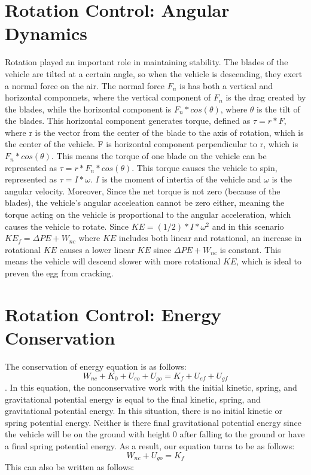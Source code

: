 \documentclass[12pt]{report}
\begin{document}
\section{Rotation Control: Angular Dynamics}
Rotation played an important role in maintaining stability. The blades of the vehicle are tilted at a certain angle, so when the vehicle is descending, they exert a normal force on the air.  The normal force $F_n$ is has both a vertical and horizontal componnets, where the vertical component of $F_n$ is the drag created by the blades, while the horizontal component is $ F_n*cos(\theta)$, where $\theta$ is the tilt of the blades. This horizontal component generates torque, defined as $\tau = r * F$, where r is the vector from the center of the blade to the axis of rotation, which is the center of the vehicle. F is horizontal component perpendicular to r, which is $ F_n*cos(\theta)$. This means the torque of one blade on the vehicle can be represented as $\tau = r * F_n*cos(\theta)$. This torque causes the vehicle to spin, represented as $\tau = I*\omega$. $I$ is the moment of intertia of the vehicle and $\omega$ is the angular velocity. Moreover, Since the net torque is not zero (because of the blades), the vehicle's angular acceleation cannot be zero either, meaning the torque acting on the vehicle is proportional to the angular acceleration, which causes the vehicle to rotate. Since $KE = (1/2)*I*\omega^2$ and in this scenario $KE_f = \Delta PE + W_{nc}$ where $KE$ includes both linear and rotational, an increase in rotational $KE$ causes a lower linear $KE$ since $\Delta PE + W_{nc}$ is constant. This means the vehicle will descend slower with more rotational $KE$, which is ideal to preven the egg from cracking.



\section{Rotation Control: Energy Conservation}
The conservation of energy equation is as follows: 
\begin{equation} \label{eq:4}
W_{nc}+K_0+U_{eo}+U_{go} = K_{f}+U_{ef}+U_{gf}
\end{equation}
. In this equation, the nonconservative work with the initial kinetic, spring, and gravitational potential energy is equal to the final kinetic, spring, and gravitational potential energy. In this situation, there is no initial kinetic or spring potential energy. Neither is there final gravitational potential energy since the vehicle will be on the ground with height 0 after falling to the ground or have a final spring potential energy. As a result, our equation turns to be as follows:
\begin{equation} \label{eq:5}
W_{nc}+U_{go} = K_{f}
\end{equation}
This can also be written as follows:
\end{document}
